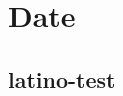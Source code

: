\documentclass[italian]{article}
\begin{document}
	\section{Date}
	\subsection{latino-test}
	
	
	
\end{document}
